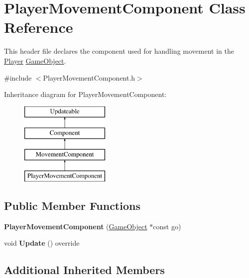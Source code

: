 \hypertarget{class_player_movement_component}{}\section{Player\+Movement\+Component Class Reference}
\label{class_player_movement_component}


This header file declares the component used for handling movement in the \hyperlink{class_player}{Player} \hyperlink{class_game_object}{Game\+Object}.  




{\ttfamily \#include $<$Player\+Movement\+Component.\+h$>$}

Inheritance diagram for Player\+Movement\+Component\+:\begin{figure}[H]
\begin{center}
\leavevmode
\includegraphics[height=4.000000cm]{class_player_movement_component}
\end{center}
\end{figure}
\subsection*{Public Member Functions}
\begin{DoxyCompactItemize}
\item 
\hypertarget{class_player_movement_component_a447d7b7f468762e0908225bab1ab71fc}{}{\bfseries Player\+Movement\+Component} (\hyperlink{class_game_object}{Game\+Object} $\ast$const go)\label{class_player_movement_component_a447d7b7f468762e0908225bab1ab71fc}

\item 
\hypertarget{class_player_movement_component_a9d70eb70c12cd14116b7bd192e8cfb0b}{}void {\bfseries Update} () override\label{class_player_movement_component_a9d70eb70c12cd14116b7bd192e8cfb0b}

\end{DoxyCompactItemize}
\subsection*{Additional Inherited Members}


